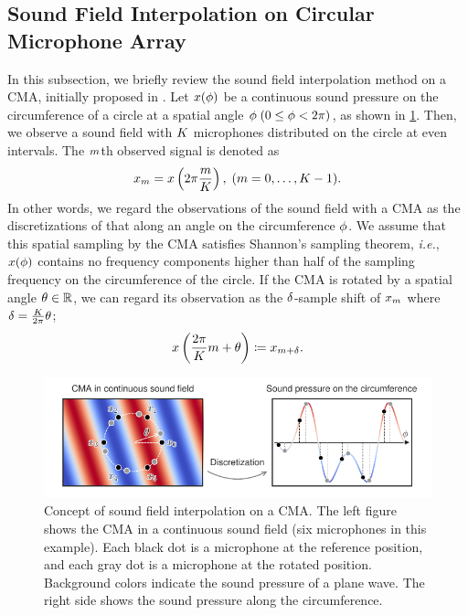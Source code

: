 \documentclass[sip,biber]{now-journal}
\begin{document}
\subsection{Sound Field Interpolation on Circular Microphone Array}
In this subsection, we briefly review the sound field interpolation method on a CMA, initially proposed in \cite{Wakabayashi:2021:ICASSP,Wakabayashi:2023:ASLP}.
Let $x (\phi)$ be a continuous sound pressure on the circumference of a circle at a spatial angle $\phi \; ({0} \leq \phi < {2\pi})$, as shown in \cref{fig:sfi}.
Then, we observe a sound field with $K$ microphones distributed on the circle at even intervals.
The $m$th observed signal is denoted as
\begin{equation}
  \sfcma _{\mic} = \sfcma \left(2\pi \frac{\mic}{\Mic}\right),\; (\mic = 0, \dots, \Mic - 1).%
  \label{eq:sfi:model}
\end{equation}
In other words, we regard the observations of the sound field with a CMA as the discretizations of that along an angle on the circumference $\phi$.
We assume that this spatial sampling by the CMA satisfies Shannon's sampling theorem, \emph{i.e.}, $x (\phi)$ contains no frequency components higher than half of the sampling frequency on the circumference of the circle.
If the CMA is rotated by a spatial angle $\theta \in \mathbb{R}$, we can regard its observation as the $\delta$-sample shift of $x _{m}$ where $\delta = \frac{K}{2\pi} \theta$;
\begin{equation}
  \sfcma \left(\frac{2\pi}{\Mic} \mic + \rotSpat \right)%
  \coloneqq
  \sfcma _{\mic + \rotSmpl}.
  \label{eq:sfi:shift:obs}
\end{equation}
\begin{figure}[t]
  \centering
  \includegraphics{figures/diagrams/sfi.pdf}
  \caption{%
    Concept of sound field interpolation on a CMA.
    The left figure shows the CMA in a continuous sound field (six microphones in this example).
    Each black dot is a microphone at the reference position, and each gray dot is a microphone at the rotated position.
    Background colors indicate the sound pressure of a plane wave.
    The right side shows the sound pressure along the circumference.
  }%
  \label{fig:sfi}
\end{figure}
\end{document}
